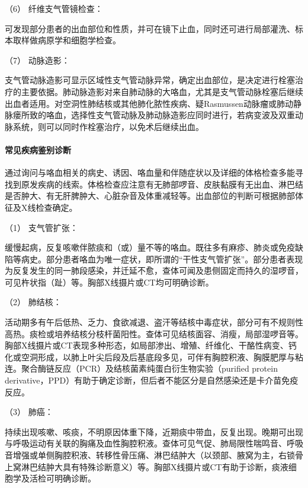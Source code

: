 \hypertarget{text00024.htmlux5cux23CHP1-9-2-4-6}{}
（6） 纤维支气管镜检查：

可发现部分患者的出血部位和性质，并可在镜下止血，同时还可进行局部灌洗、标本取样做病原学和细胞学检查。

\hypertarget{text00024.htmlux5cux23CHP1-9-2-4-7}{}
（7） 动脉造影：

支气管动脉造影可显示区域性支气管动脉异常，确定出血部位，是决定进行栓塞治疗的主要依据。肺动脉造影对来自肺动脉的大咯血，尤其是支气管动脉栓塞后继续出血者适用。对空洞性肺结核或其他肺化脓性疾病、疑Rasmussen动脉瘤或肺动静脉瘘所致的咯血，选择性支气管动脉及肺动脉造影应同时进行，若病变波及双重动脉系统，则可以同时作栓塞治疗，以免术后继续出血。

\paragraph{常见疾病鉴别诊断}

通过询问与咯血相关的病史、诱因、咯血量和伴随症状以及详细的体格检查多能寻找到原发疾病的线索。体格检查应注意有无肺部啰音、皮肤黏膜有无出血、淋巴结是否肿大、有无肝脾肿大、心脏杂音及体重减轻等。出血部位的判断可根据肺部体征及X线检查确定。

\hypertarget{text00024.htmlux5cux23CHP1-9-2-5-1}{}
（1） 支气管扩张：

缓慢起病，反复咳嗽伴脓痰和（或）量不等的咯血。既往多有麻疹、肺炎或免疫缺陷等病史。部分患者咯血为唯一症状，即所谓的“干性支气管扩张”。部分患者表现为反复发生的同一肺段感染，并迁延不愈，查体可闻及患侧固定而持久的湿啰音，可见杵状指（趾）等。胸部X线摄片或CT均可明确诊断。

\hypertarget{text00024.htmlux5cux23CHP1-9-2-5-2}{}
（2） 肺结核：

活动期多有午后低热、乏力、食欲减退、盗汗等结核中毒症状，部分可有不规则性高热。痰检或培养结核分枝杆菌阳性。查体可见结核面容、消瘦，局部湿啰音等。胸部X线摄片或CT表现多种形态，如局部渗出、增殖、纤维化、干酪性病变、钙化或空洞形成，以肺上叶尖后段及后基底段多见，可伴有胸腔积液、胸膜肥厚与粘连。聚合酶链反应（PCR）及结核菌素纯蛋白衍生物实验（purified
protein
derivative，PPD）有助于确定诊断，但后者不能区分是自然感染还是卡介苗免疫反应。

\hypertarget{text00024.htmlux5cux23CHP1-9-2-5-3}{}
（3） 肺癌：

持续出现咳嗽、咳痰，不明原因体重下降，近期痰中带血，反复出现。晚期可出现与呼吸运动有关联的胸痛及血性胸腔积液。查体可见气促、肺局限性喘鸣音、呼吸音增强或单侧胸腔积液、转移性骨压痛、淋巴结肿大（以颈部、腋窝为主，右锁骨上窝淋巴结肿大具有特殊诊断意义）等。胸部X线摄片或CT有助于诊断，痰液细胞学及活检可明确诊断。

